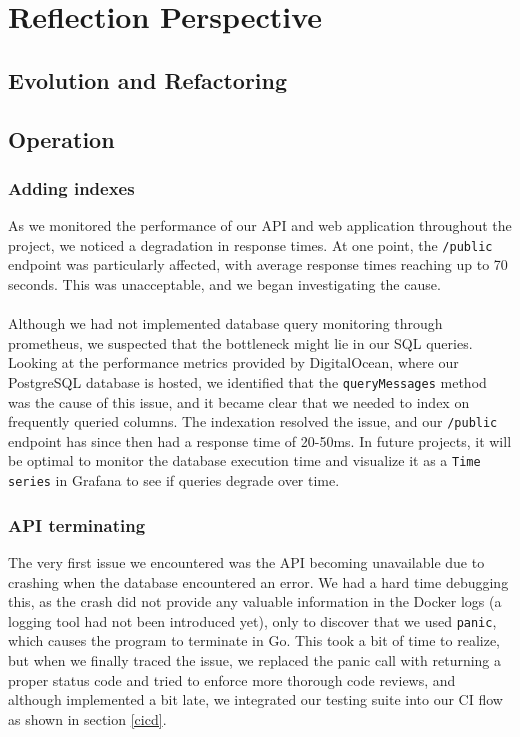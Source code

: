 \section{Reflection Perspective}
\subsection{Evolution and Refactoring}


\subsection{Operation}\label{operation}
\subsubsection{Adding indexes}
As we monitored the performance of our API and web application throughout the project, we noticed a degradation in response times. At one point, the \texttt{/public} endpoint was particularly affected, with average response times reaching up to 70 seconds. This was unacceptable, and we began investigating the cause.
\\\\
Although we had not implemented database query monitoring through prometheus, we suspected that the bottleneck might lie in our SQL queries. Looking at the performance metrics provided by DigitalOcean, where our PostgreSQL database is hosted, we identified that the \texttt{queryMessages} method was the cause of this issue, and it became clear that we needed to index on frequently queried columns. The indexation resolved the issue, and our \texttt{/public} endpoint has since then had a response time of 20-50ms. In future projects, it will be optimal to monitor the database execution time and visualize it as a \texttt{Time series} in Grafana to see if queries degrade over time.

\subsubsection{API terminating}
The very first issue we encountered was the API becoming unavailable due to crashing when the database encountered an error. We had a hard time debugging this, as the crash did not provide any valuable information in the Docker logs (a logging tool had not been introduced yet), only to discover that we used \texttt{panic}, which causes the program to terminate in Go. This took a bit of time to realize, but when we finally traced the issue, we replaced the panic call with returning a proper status code and tried to enforce more thorough code reviews, and although implemented a bit late, we integrated our testing suite into our CI flow as shown in section \ref{cicd}.

